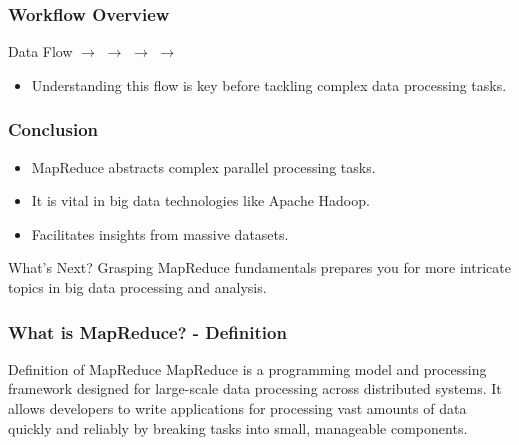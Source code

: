 \documentclass[aspectratio=169]{beamer}
\begin{document}
\begin{frame}[fragile]
    \frametitle{Workflow Overview}
    \begin{block}{Data Flow}
        \centering
         $\rightarrow$  $\rightarrow$  $\rightarrow$  $\rightarrow$ 
    \end{block}
    \begin{itemize}
        \item Understanding this flow is key before tackling complex data processing tasks.
    \end{itemize}
\end{frame}

\begin{frame}[fragile]
    \frametitle{Conclusion}
    \begin{itemize}
        \item MapReduce abstracts complex parallel processing tasks.
        \item It is vital in big data technologies like Apache Hadoop.
        \item Facilitates insights from massive datasets.
    \end{itemize}
    \begin{block}{What’s Next?}
        Grasping MapReduce fundamentals prepares you for more intricate topics in big data processing and analysis.
    \end{block}
\end{frame}

\begin{frame}[fragile]
  \frametitle{What is MapReduce? - Definition}
  \begin{block}{Definition of MapReduce}
    MapReduce is a programming model and processing framework designed for large-scale data processing across distributed systems. It allows developers to write applications for processing vast amounts of data quickly and reliably by breaking tasks into small, manageable components.
  \end{block}
\end{frame}
\end{document}
